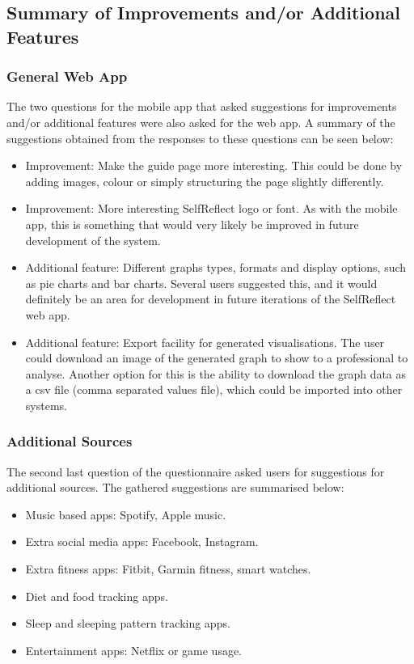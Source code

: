 \documentclass[11pt,openright,a4paper]{report}
\begin{document}
\subsection{Summary of Improvements and/or Additional Features} \label{subsec:addsources}
\subsubsection{General Web App}
The two questions for the mobile app that asked suggestions for improvements and/or additional features were also asked for the web app. A summary of the suggestions obtained from the responses to these questions can be seen below:
\begin{itemize}
\item Improvement: Make the guide page more interesting. This could be done by adding images, colour or simply structuring the page slightly differently.
\item Improvement: More interesting SelfReflect logo or font. As with the mobile app, this is something that would very likely be improved in future development of the system.
\item Additional feature: Different graphs types, formats and display options, such as pie charts and bar charts. Several users suggested this, and it would definitely be an area for development in future iterations of the SelfReflect web app.
\item Additional feature: Export facility for generated visualisations. The user could download an image of the generated graph to show to a professional to analyse. Another option for this is the ability to download the graph data as a csv file (comma separated values file), which could be imported into other systems.
\end{itemize}

\newpage
\subsubsection{Additional Sources}
The second last question of the questionnaire asked users for suggestions for additional sources. The gathered suggestions are summarised below:
\begin{itemize}
\item Music based apps: Spotify, Apple music.
\item Extra social media apps: Facebook, Instagram.
\item Extra fitness apps: Fitbit, Garmin fitness, smart watches.
\item Diet and food tracking apps.
\item Sleep and sleeping pattern tracking apps.
\item Entertainment apps: Netflix or game usage.
\end{itemize}
\end{document}
